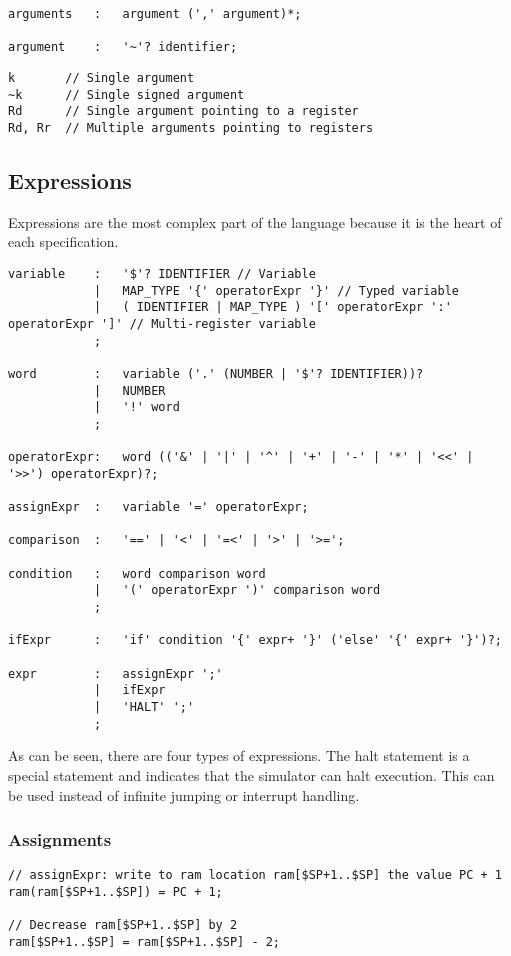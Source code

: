\lstset{caption=Argument specifation}
\begin{lstlisting}
arguments	:	argument (',' argument)*;

argument	:	'~'? identifier;
\end{lstlisting}

\lstset{caption=Example arguments}
\begin{lstlisting}
k		// Single argument
~k		// Single signed argument
Rd		// Single argument pointing to a register
Rd, Rr	// Multiple arguments pointing to registers
\end{lstlisting}

\subsection{Expressions}
Expressions are the most complex part of the language because it is the heart
of each specification.
\lstset{caption=Expressions}
\begin{lstlisting}[name=expressions]
variable	:	'$'? IDENTIFIER // Variable
			|	MAP_TYPE '{' operatorExpr '}' // Typed variable
			|	( IDENTIFIER | MAP_TYPE ) '[' operatorExpr ':' operatorExpr ']' // Multi-register variable
			;

word 		:	variable ('.' (NUMBER | '$'? IDENTIFIER))?
			|	NUMBER
			|	'!' word
			;

operatorExpr:	word (('&' | '|' | '^' | '+' | '-' | '*' | '<<' | '>>') operatorExpr)?;

assignExpr	:	variable '=' operatorExpr;

comparison	:	'==' | '<' | '=<' | '>' | '>=';

condition	:	word comparison word
			|	'(' operatorExpr ')' comparison word
			;

ifExpr		:	'if' condition '{' expr+ '}' ('else' '{' expr+ '}')?;

expr		:	assignExpr ';'
			|	ifExpr
			|	'HALT' ';'
			;
\end{lstlisting}

As can be seen, there are four types of expressions. The halt statement is a
special statement and indicates that the simulator can halt execution. This can
be used instead of infinite jumping or interrupt handling.

\subsubsection{Assignments}
\lstset{caption=Assignments}
\begin{lstlisting}
// assignExpr: write to ram location ram[$SP+1..$SP] the value PC + 1
ram(ram[$SP+1..$SP]) = PC + 1;

// Decrease ram[$SP+1..$SP] by 2
ram[$SP+1..$SP] = ram[$SP+1..$SP] - 2;
\end{lstlisting}

